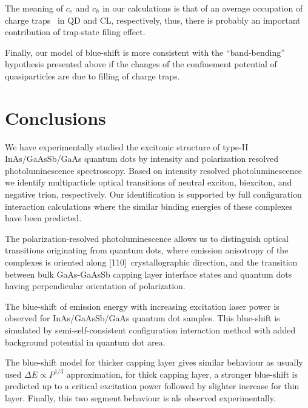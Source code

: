 The meaning of $c_e$ and $c_h$ in our calculations is that of an average occupation of charge traps~\cite{Reimer2016} in QD and CL, respectively, thus, there is probably an important contribution of trap-state filing effect. 

Finally, our model of blue-shift is more consistent with the ``band-bending'' hypothesis presented above if the changes of the confinement potential of quasiparticles are due to filling of charge traps.

\section*{Conclusions}
We have experimentally studied the excitonic structure of type-II InAs/GaAsSb/GaAs quantum dots by intensity and polarization resolved photoluminescence spectroscopy. Based on intensity resolved photoluminescence we identify multiparticle optical transitions of neutral exciton, biexciton, and negative trion, respectively. Our identification is supported by full configuration interaction calculations where the similar binding energies of these complexes have been predicted. 

The polarization-resolved photoluminescence allows us to distinguish optical transitions originating from quantum dots, where emission anisotropy of the complexes is oriented along [110]~crystallographic direction, and the transition between bulk GaAs-GaAsSb capping layer interface states and quantum dots having perpendicular orientation of polarization.

The blue-shift of emission energy with increasing excitation laser power is observed for InAs/GaAsSb/GaAs quantum dot samples. This blue-shift is simulated by semi-self-consistent configuration interaction method with added background potential in quantum dot area.

The blue-shift model for thicker capping layer gives similar behaviour as usually used $\Delta E\propto P^{1/3}$ approximation, for thick capping layer, a stronger blue-shift is predicted up to a critical excitation power followed by slighter increase for thin layer. Finally, this two segment behaviour is als observed experimentally.
\newpage